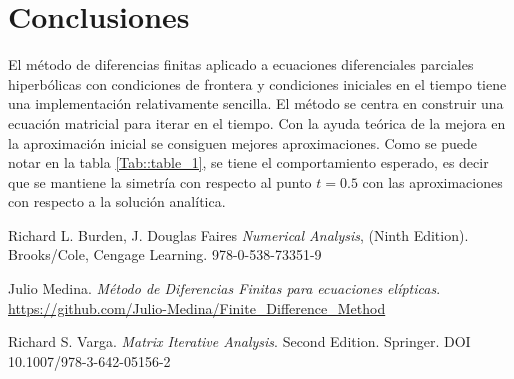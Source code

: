 \documentclass[a4paper]{article}
\begin{document}
\section{Conclusiones}
El método de diferencias finitas aplicado a ecuaciones diferenciales parciales hiperbólicas con condiciones de frontera y condiciones iniciales en el tiempo tiene una implementación relativamente sencilla. El método se centra en construir una ecuación matricial para iterar en el tiempo. Con la ayuda teórica de la mejora en la aproximación inicial se consiguen mejores aproximaciones. Como se puede notar en la  tabla \ref{Tab::table_1}, se tiene el comportamiento esperado, es decir que se mantiene la simetría con respecto al punto $t=0.5$ con las aproximaciones con respecto a la solución analítica.


\begin{thebibliography}{99}

 Richard L. Burden, J. Douglas Faires \textit{Numerical Analysis}, (Ninth Edition). Brooks/Cole, Cengage Learning. 978-0-538-73351-9

 Julio Medina. \textit{Método de Diferencias Finitas para ecuaciones elípticas}. \url{https://github.com/Julio-Medina/Finite_Difference_Method}

 Richard S. Varga. \textit{Matrix Iterative Analysis}. Second Edition. Springer. DOI 10.1007/978-3-642-05156-2






\end{thebibliography}
\end{document}
